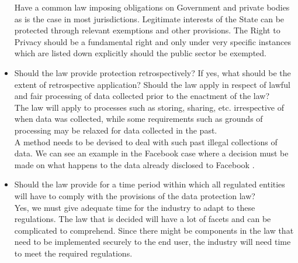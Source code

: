 \begin{itemize}
	Have a common law imposing obligations on Government and private bodies as is the case in most jurisdictions. Legitimate interests of the State can be protected through relevant exemptions and other provisions. The Right to Privacy should be a fundamental right and only under very specific instances which are listed down explicitly should the public sector be exempted.
	\item Should the law provide protection retrospectively? If yes, what should be the extent of retrospective application? Should the law apply in respect of lawful and fair processing of data collected prior to the enactment of the law?
	\\
	The law will apply to processes such as storing, sharing, etc. irrespective of when data was collected, while some requirements such as grounds of processing may be relaxed for data collected in the past.
	\\
	A method needs to be devised to deal with such past illegal collections of data. We can see an example in the Facebook case where a decision must be made on what happens to the data already disclosed to Facebook \cite{whatuserthird}.
	\item Should the law provide for a time period within which all regulated entities will have to comply with the provisions of the data protection law?
	\\
	Yes, we must give adequate time for the industry to adapt to these regulations. The law that is decided will have a lot of facets and can be complicated to comprehend. Since there might be components in the law that need to be implemented securely to the end user, the industry will need time to meet the required regulations.
\end{itemize}
